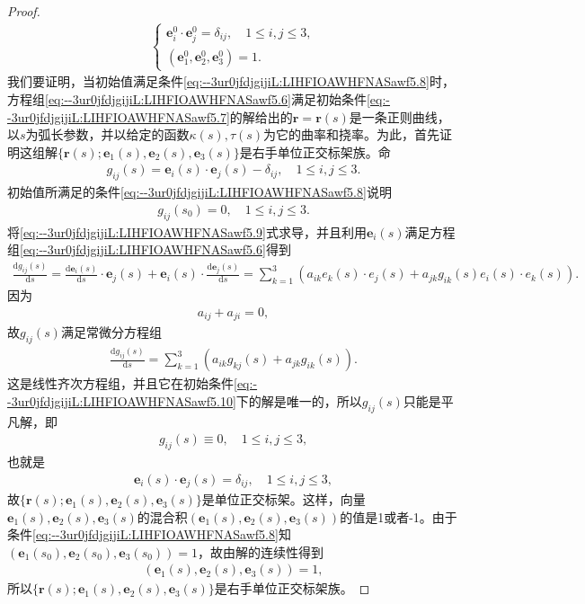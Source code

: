 \documentclass[../../main.tex]{subfiles}%
\begin{document}
\begin{proof}
\begin{align}
\begin{cases}
\bm{e}_i^0 \cdot \bm{e}_j^0 = \delta_{ij},\quad 1 \leqslant i,j \leqslant 3, \\
(\bm{e}_1^0,\bm{e}_2^0,\bm{e}_3^0) = 1.
\end{cases}
\label{eq:--3ur0jfdjgijiL:LIHFIOAWHFNASawf5.8}
\end{align}
我们要证明，当初始值满足条件\eqref{eq:--3ur0jfdjgijiL:LIHFIOAWHFNASawf5.8}时，方程组\eqref{eq:--3ur0jfdjgijiL:LIHFIOAWHFNASawf5.6}满足初始条件\eqref{eq:--3ur0jfdjgijiL:LIHFIOAWHFNASawf5.7}的解给出的$\bm{r} = \bm{r}(s)$是一条正则曲线，以$s$为弧长参数，并以给定的函数$\kappa(s),\tau(s)$为它的曲率和挠率。为此，首先证明这组解$\{\bm{r}(s);\bm{e}_1(s),\bm{e}_2(s),\bm{e}_3(s)\}$是右手单位正交标架族。命
\begin{align}
g_{ij}(s) = \bm{e}_i(s) \cdot \bm{e}_j(s) - \delta_{ij},\quad 1 \leqslant i,j \leqslant 3.
\label{eq:--3ur0jfdjgijiL:LIHFIOAWHFNASawf5.9}
\end{align}
初始值所满足的条件\eqref{eq:--3ur0jfdjgijiL:LIHFIOAWHFNASawf5.8}说明
\begin{align}
g_{ij}(s_0) = 0,\quad 1 \leqslant i,j \leqslant 3.
\label{eq:--3ur0jfdjgijiL:LIHFIOAWHFNASawf5.10}
\end{align}
将\eqref{eq:--3ur0jfdjgijiL:LIHFIOAWHFNASawf5.9}式求导，并且利用$\bm{e}_i(s)$满足方程组\eqref{eq:--3ur0jfdjgijiL:LIHFIOAWHFNASawf5.6}得到
\begin{align*}
\frac{\mathrm{d}g_{ij}\left( s \right)}{\mathrm{d}s}=\frac{\mathrm{d}\boldsymbol{e}_i\left( s \right)}{\mathrm{d}s}\cdot \boldsymbol{e}_j\left( s \right) +\boldsymbol{e}_i\left( s \right) \cdot \frac{\mathrm{d}\boldsymbol{e}_j\left( s \right)}{\mathrm{d}s}=\sum_{k=1}^3{\left( a_{ik}e_k\left( s \right) \cdot e_j\left( s \right) +a_{jk}g_{ik}\left( s \right) e_i\left( s \right) \cdot e_k\left( s \right) \right)}.
\end{align*}
因为
\begin{align*}
a_{ij} + a_{ji} = 0,
\end{align*}
故$g_{ij}(s)$满足常微分方程组
\begin{align*}
\frac{\mathrm{d}g_{ij}(s)}{\mathrm{d}s} = \sum\limits_{k=1}^3 (a_{ik}g_{kj}(s) + a_{jk}g_{ik}(s)).
\end{align*}
这是线性齐次方程组，并且它在初始条件\eqref{eq:--3ur0jfdjgijiL:LIHFIOAWHFNASawf5.10}下的解是唯一的，所以$g_{ij}(s)$只能是平凡解，即
\begin{align*}
g_{ij}(s) \equiv 0,\quad 1 \leqslant i,j \leqslant 3,
\end{align*}
也就是
\begin{align*}
\bm{e}_i(s) \cdot \bm{e}_j(s) = \delta_{ij},\quad 1 \leqslant i,j \leqslant 3,
\end{align*}
故$\{\bm{r}(s);\bm{e}_1(s),\bm{e}_2(s),\bm{e}_3(s)\}$是单位正交标架。这样，向量$\bm{e}_1(s),\bm{e}_2(s),\bm{e}_3(s)$的混合积$(\bm{e}_1(s),\bm{e}_2(s),\bm{e}_3(s))$的值是1或者-1。由于条件\eqref{eq:--3ur0jfdjgijiL:LIHFIOAWHFNASawf5.8}知$(\bm{e}_1(s_0),\bm{e}_2(s_0),\bm{e}_3(s_0)) = 1$，故由解的连续性得到
\begin{align*}
(\bm{e}_1(s),\bm{e}_2(s),\bm{e}_3(s)) = 1,
\end{align*}
所以$\{\bm{r}(s);\bm{e}_1(s),\bm{e}_2(s),\bm{e}_3(s)\}$是右手单位正交标架族。


\end{proof}
\end{document}
